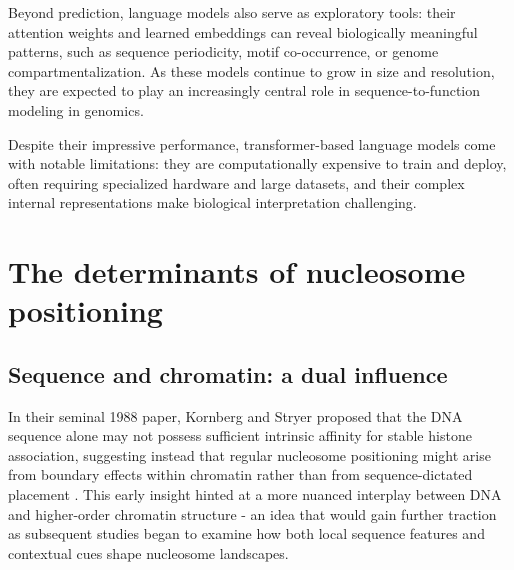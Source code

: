 \documentclass[11pt]{book}
\begin{document}
Beyond prediction, language models also serve as exploratory tools: their attention weights and learned embeddings can reveal biologically meaningful patterns, such as sequence periodicity, motif co-occurrence, or genome compartmentalization. As these models continue to grow in size and resolution, they are expected to play an increasingly central role in sequence-to-function modeling in genomics.

Despite their impressive performance, transformer-based language models come with notable limitations: they are computationally expensive to train and deploy, often requiring specialized hardware and large datasets, and their complex internal representations make biological interpretation challenging.

\newpage
\section{The determinants of nucleosome positioning}
\subsection{Sequence and chromatin: a dual influence}
In their seminal 1988 paper, Kornberg and Stryer proposed that the DNA sequence alone may not possess sufficient intrinsic affinity for stable histone association, suggesting instead that regular nucleosome positioning might arise from boundary effects within chromatin rather than from sequence-dictated placement \cite{kornberg_statistical_1988}. This early insight hinted at a more nuanced interplay between DNA and higher-order chromatin structure - an idea that would gain further traction as subsequent studies began to examine how both local sequence features and contextual cues shape nucleosome landscapes.
\end{document}
